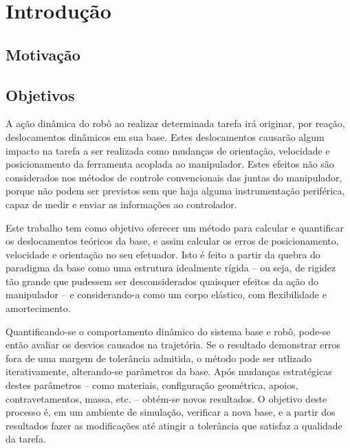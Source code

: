 \chapter{Introdução}

% 

\section{Motivação}


\section{Objetivos}

A ação dinâmica do robô ao realizar determinada tarefa irá originar, por reação,
deslocamentos dinâmicos em sua base. Estes deslocamentos causarão algum impacto
na tarefa a ser realizada como mudanças de orientação, velocidade e
posicionamento da ferramenta acoplada ao manipulador. Estes efeitos não são
considerados nos métodos de controle convencionais das juntas do manipulador,
porque não podem ser previstos sem que haja alguma instrumentação periférica,
capaz de medir e enviar as informações ao controlador.

Este trabalho tem como objetivo oferecer um método para calcular e quantificar
os deslocamentos teóricos da base, e assim calcular os erros de posicionamento,
velocidade e orientação no seu efetuador. Isto é feito a partir da
quebra do paradigma da base como uma estrutura idealmente rígida -- ou seja, de
rigidez tão grande que pudessem ser desconsiderados quaisquer efeitos da ação do
manipulador -- e considerando-a como um corpo elástico, com flexibilidade e
amortecimento.

Quantificando-se o comportamento dinâmico do sistema base e robô, pode-se então
avaliar os desvios causados na trajetória. Se o resultado demonstrar erros fora
de uma margem de tolerância admitida, o método pode ser utlizado iterativamente,
alterando-se parâmetros da base.
Após mudanças estratégicas destes parâmetros -- como materiais, configuração
geométrica, apoios, contravetamentos, massa, etc. -- obtém-se novos resultados.
O objetivo deste processo é, em um ambiente de simulação, verificar a nova base,
e a partir dos resultados fazer as modificações até atingir a tolerância que
satisfaz a qualidade da tarefa.


